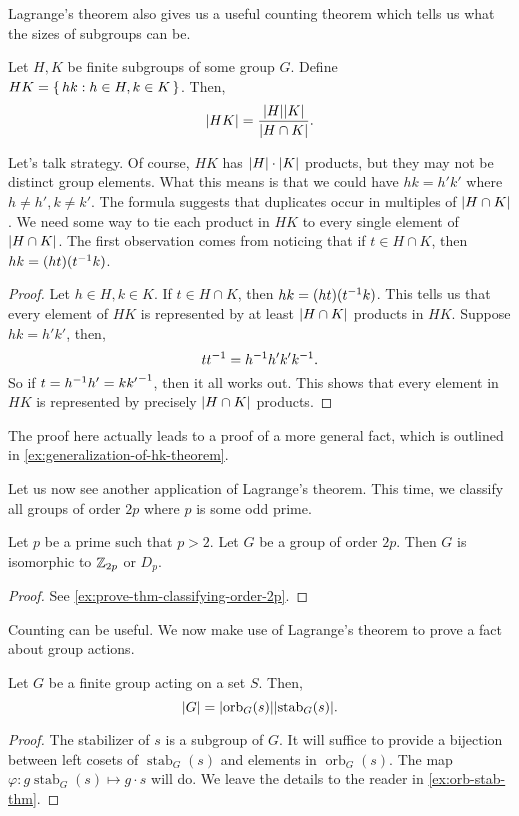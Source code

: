 \documentclass[./main.tex]{subfiles}
\begin{document}
Lagrange's theorem also gives us a useful counting theorem which tells us what
the sizes of subgroups can be.
\begin{theorem}[$HK$ theorem]
\label{thm:hk-theorem}
    Let $H, K$ be finite subgroups of some group $G$. Define $HK = \set{hk : h \in H, k \in K}$. Then, 
    \[
        \abs{HK} = \frac{\abs H \abs K}{\abs{H \cap K}}.
    \]
\end{theorem}
Let's talk strategy. Of course, $HK$ has $\abs H \cdot \abs K$ products, but
they may not be distinct group elements. What this means is that we could have
$hk = h' k'$ where $h \neq h', k \neq k'$. The formula suggests that duplicates
occur in multiples of $\abs{H \cap K}$. We need some way to tie each product in
$HK$ to every single element of $\abs{H \cap K}$. The first observation comes
from noticing that if $t \in H \cap K$, then $hk = (ht)(t^{-1} k)$. 

\begin{proof}
    Let $h \in H, k\in K$. If $t \in H \cap K$, then $hk = (ht)(t^{-1} k)$. This
    tells us that every element of $HK$ is represented by at least $\abs{H \cap
    K}$ products in $HK$. Suppose $hk = h' k'$, then,
    \[
        t t^{-1} = h^{-1} h' k' k^{-1}.
    \]
    So if $t = h^{-1} h' = k {k'}^{-1}$, then it all works out. This shows that
    every element in $HK$ is represented by precisely $\abs{H \cap K}$ products.
\end{proof}
The proof here actually leads to a proof of a more general fact, which is
outlined in \cref{ex:generalization-of-hk-theorem}.


Let us now see another application of Lagrange's theorem. This time, we classify
all groups of order $2p$ where $p$ is some odd prime.
\begin{theorem}
\label{thm:groups-order-2p}
    Let $p$ be a prime such that $p > 2$. Let $G$ be a group of order $2p$. Then
    $G$ is isomorphic to $\mathbb{Z}_{2p}$ or $D_p$.
\end{theorem}
\begin{proof}
    See \cref{ex:prove-thm-classifying-order-2p}.
\end{proof}


Counting can be useful. We now make use of Lagrange's theorem to prove a fact
about group actions.
\begin{theorem}
\label{thm:orb-stab-thm}
    Let $G$ be a finite group acting on a set $S$. Then,
    \[
        \abs{G} = \abs{\operatorname{orb}_G (s)} \abs{\operatorname{stab}_G (s)}.
    \]
\end{theorem}
\begin{proof}
    The stabilizer of $s$ is a subgroup of $G$. It will suffice to provide a
    bijection between left cosets of $\operatorname{stab}_G (s)$ and elements in
    $\operatorname{orb}_G(s)$. The map $\varphi: g \operatorname{stab}_G (s) \mapsto g
    \cdot s$ will do. We leave the details to the reader in
    \cref{ex:orb-stab-thm}.
\end{proof}
\end{document}
